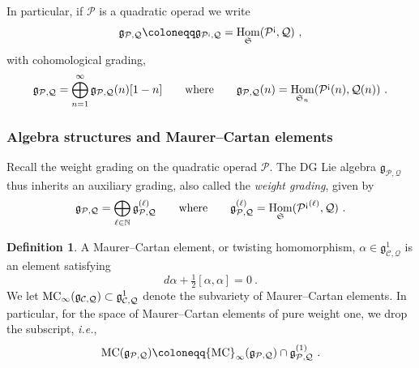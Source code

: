 \documentclass[11pt]{amsart}
\numberwithin{equation}{section}
\theoremstyle{definition}
\newtheorem{defn}[theo]{Definition}
\newcommand{\bb}{\mathbb}
\newcommand{\mc}{\mathcal}
\newcommand{\mf}{\mathfrak}
\newcommand{\N}{{\mathbb{N}}}
\DeclareMathOperator{\Hom}{Hom}
\newcommand{\Mod}{{\textup{-Mod}}}
\newcommand{\K}{{\bb K}}
\newcommand{\ash}{{\textup{\mbox{!`}}}}
\newcommand{\Ss}{{{\mf{S}}}}
\newcommand{\MC}{{{\textup{MC}}}}
\newcommand{\CC}{{\textup{CC}}}
\newcommand{\0}{{\textbf{0}}}
\newcommand{\g}{{\mf{g}}}
\def\IN{\mathbb{N}}
\def\CC{{\mc C}}
\def\PP{{\mc P}}
\def\QQ{{\mc Q}}
\def\gf{\mathfrak{g}}
\def \mf{\mathfrak}
\def \ie{{\it i.e.}}
\begin{document}
In particular, if $\PP$ is a quadratic operad we write 
\[
\gf_{\PP,\QQ} \coloneqq \gf_{\PP^\ash,\QQ}=\Hom_\Ss(\PP^\ash,\QQ)~,
\]
with cohomological grading,
\[
\gf_{\PP,\QQ}=\bigoplus_{n=1}^\infty \gf_{\PP,\QQ}(n)[1-n] \qquad\text{where}\qquad \gf_{\PP,\QQ}(n) = \Hom_{\Ss_n}(\PP^\ash(n),\QQ(n))~.
\]


\subsubsection{Algebra structures and Maurer--Cartan elements} 



Recall the weight grading on the quadratic operad $\PP$. The DG Lie algebra $\g_{\mc P,\mc Q}$ thus inherits an auxiliary grading, also called the \emph{weight grading}, given by
\[ 
\g_{\mc P,\mc Q}=\bigoplus_{\ell\in \IN}\g_{\mc P,\mc Q}^{(\ell)} \qquad\text{where}\qquad  \g_{\mc P,\mc Q}^{(\ell)}=\Hom_{\Ss}({\mc P^{\ash}}^{ (\ell)} ,\mc Q) \ .
\]
\begin{defn}
	A Maurer--Cartan element, or twisting homomorphism, $\alpha\in \gf^1_{\CC,\QQ}$ is an element satisfying
	\[
	d\alpha + \tfrac12 [\alpha,\alpha]=0~.
	\]
	We let $\MC_\infty(\g_{\mc C,\mc Q})\subset \g_{\mc C,\mc Q}^1$ denote the subvariety of Maurer--Cartan elements. In particular, for the space of Maurer--Cartan elements of pure weight one, we drop the subscript, \ie,
	\[
	\MC(\gf_{\PP,\QQ})\coloneqq \MC_\infty(\gf_{\PP,\QQ})\cap \gf_{\PP,\QQ}^{(1)}~.
	\]
\end{defn}
\end{document}
